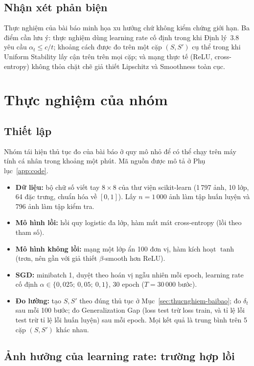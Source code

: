 \subsection{Nhận xét phản biện}

Thực nghiệm của bài báo minh họa xu hướng chứ không kiểm chứng giới hạn. Ba điểm cần lưu ý: thực nghiệm dùng learning rate cố định trong khi Định lý~3.8 yêu cầu $\alpha_t \le c/t$; khoảng cách được đo trên một cặp $(S, S')$ cụ thể trong khi Uniform Stability lấy cận trên trên mọi cặp; và mạng thực tế (ReLU, cross-entropy) không thỏa chặt chẽ giả thiết Lipschitz và Smoothness toàn cục.

\section{Thực nghiệm của nhóm}
\label{sec:thucnghiem-nhom}

\subsection{Thiết lập}

Nhóm tái hiện thủ tục đo của bài báo ở quy mô nhỏ để có thể chạy trên máy tính cá nhân trong khoảng một phút. Mã nguồn được mô tả ở Phụ lục~\ref{app:code}.
\begin{itemize}
    \item \textbf{Dữ liệu:} bộ chữ số viết tay $8\times 8$ của thư viện scikit-learn (1\,797 ảnh, 10 lớp, 64 đặc trưng, chuẩn hóa về $[0,1]$). Lấy $n = 1\,000$ ảnh làm tập huấn luyện và 796 ảnh làm tập kiểm tra.
    \item \textbf{Mô hình lồi:} hồi quy logistic đa lớp, hàm mất mát cross-entropy (lồi theo tham số).
    \item \textbf{Mô hình không lồi:} mạng một lớp ẩn 100 đơn vị, hàm kích hoạt $\tanh$ (trơn, nên gần với giả thiết $\beta$-smooth hơn ReLU).
    \item \textbf{SGD:} minibatch 1, duyệt theo hoán vị ngẫu nhiên mỗi epoch, learning rate cố định $\alpha \in \{0{,}025;\ 0{,}05;\ 0{,}1\}$, 30 epoch ($T = 30\,000$ bước).
    \item \textbf{Đo lường:} tạo $S, S'$ theo đúng thủ tục ở Mục~\ref{sec:thucnghiem-baibao}; đo $\delta_t$ sau mỗi 100 bước; đo Generalization Gap (loss test trừ loss train, và tỉ lệ lỗi test trừ tỉ lệ lỗi huấn luyện) sau mỗi epoch. Mọi kết quả là trung bình trên 5 cặp $(S, S')$ khác nhau.
\end{itemize}

\subsection{Ảnh hưởng của learning rate: trường hợp lồi}

